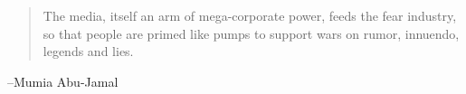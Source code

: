 \documentclass[letterpaper, landscape]{exam}
\begin{document}
  \else
    \vspace{10 cm}
    \begin{quote}
      \begin{em}
        The media, itself an arm of mega-corporate power, feeds the fear industry, so that people
        are primed like pumps to support wars on rumor, innuendo, legends and lies.
      \end{em}
    \end{quote}
    \hspace{2 cm} --Mumia Abu-Jamal
  \fi
\end{document}
